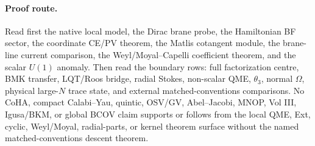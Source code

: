 \medskip
\paragraph{Proof route.}
Read first the native local model, the Dirac brane probe, the Hamiltonian
BF sector, the coordinate CE/PV theorem, the Matlis cotangent module, the
brane-line current comparison, the Weyl/Moyal--Capelli coefficient
theorem, and the scalar \(U(1)\) anomaly.  Then read the boundary rows:
full factorization centre, BMK transfer, LQT/Roos bridge, radial Stokes,
non-scalar QME, \(\theta_3\), normal \(\Omega\), physical large-\(N\)
trace state, and external matched-conventions comparisons.  No CoHA,
compact Calabi--Yau, quintic, OSV/GV, Abel--Jacobi, MNOP, Vol III,
Igusa/BKM, or global BCOV claim supports or follows from the local QME,
Ext, cyclic, Weyl/Moyal, radial-parts, or kernel theorem surface without
the named matched-conventions descent theorem.

\medskip
